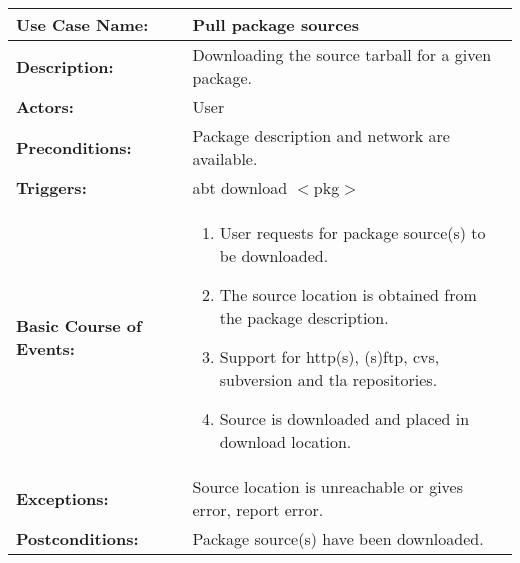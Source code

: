 
\begin{tabularx}{\linewidth}{|l|X|}
\hline
\textbf{Use Case Name:} & \textbf{Pull package sources} \\
\hline
\textbf{Description:} & 
Downloading the source tarball for a given package. \\
\hline
\textbf{Actors:} & User \\
\hline
\textbf{Preconditions:} & 
Package description and network are available. \\
\hline
\textbf{Triggers:} & abt download $<$pkg$>$  \\
\hline
\textbf{Basic Course of Events:} & 
\begin{minipage}{\linewidth} 
  \vspace{0.05em}
  \begin{enumerate}
    \item User requests for package source(s) to be downloaded.
    \item The source location is obtained from the package description.
    \item Support for http(s), (s)ftp, cvs, subversion and tla repositories.
    \item Source is downloaded and placed in download location.
  \end{enumerate}
  \vspace{0.05em}
\end{minipage}
\\
\hline
\textbf{Exceptions:} & 
Source location is unreachable or gives error, report error. \\
\hline 
\textbf{Postconditions:} &
Package source(s) have been downloaded.
\\
\hline
\end{tabularx}


